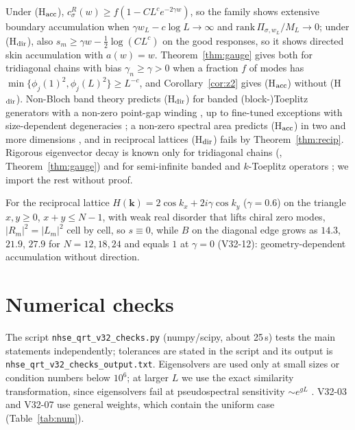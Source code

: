 \documentclass[11pt]{article}
\theoremstyle{definition}
\theoremstyle{remark}
\begin{document}
Under (H$_{\rm acc}$), $c^R_\sigma(w)\ge f(1-CL^ce^{-2\gamma w})$, so the family shows extensive boundary accumulation when $\gamma w_L-c\log L\to\infty$ and $\mathrm{rank}\,\Pi_{\sigma,w_L}/M_L\to0$; under (H$_{\rm dir}$), also $s_m\ge\gamma w-\frac12\log(CL^c)$ on the good responses, so it shows directed skin accumulation with $a(w)=w$. Theorem~\ref{thm:gauge} gives both for tridiagonal chains with bias $\gamma_n\ge\gamma>0$ when a fraction $f$ of modes has $\min\{\phi_j(1)^2,\phi_j(L)^2\}\ge L^{-c}$, and Corollary~\ref{cor:z2} gives (H$_{\rm acc}$) without (H$_{\rm dir}$). Non-Bloch band theory \cite{YW18,YM19,LT19} predicts (H$_{\rm dir}$) for banded (block-)Toeplitz generators with a non-zero point-gap winding \cite{OKSS20,ZYF20}, up to fine-tuned exceptions with size-dependent degeneracies \cite{GBZ23}; a non-zero spectral area predicts (H$_{\rm acc}$) in two and more dimensions \cite{ZYF22}, and in reciprocal lattices (H$_{\rm dir}$) fails by Theorem~\ref{thm:recip}. Rigorous eigenvector decay is known only for tridiagonal chains (\cite{ABCDH24}, Theorem~\ref{thm:gauge}) and for semi-infinite banded and $k$-Toeplitz operators \cite{ABDLT25,BDDH25}; we import the rest without proof.

For the reciprocal lattice $H(\mathbf k)=2\cos k_x+2i\gamma\cos k_y$ ($\gamma=0.6$) on the triangle $x,y\ge0$, $x+y\le N-1$, with weak real disorder that lifts chiral zero modes, $|R_m|^2=|L_m|^2$ cell by cell, so $s\equiv0$, while $B$ on the diagonal edge grows as $14.3$, $21.9$, $27.9$ for $N=12,18,24$ and equals $1$ at $\gamma=0$ (V32-12): geometry-dependent accumulation without direction.

\section{Numerical checks}
\label{sec:num}

The script \texttt{nhse\_qrt\_v32\_checks.py} (numpy/scipy, about 25\,s) tests the main statements independently; tolerances are stated in the script and its output is \texttt{nhse\_qrt\_v32\_checks\_output.txt}. Eigensolvers are used only at small sizes or condition numbers below $10^6$; at larger $L$ we use the exact similarity transformation, since eigensolvers fail at pseudospectral sensitivity $\sim e^{gL}$ \cite{TE05}. V32-03 and V32-07 use general weights, which contain the uniform case (Table~\ref{tab:num}).
\end{document}

